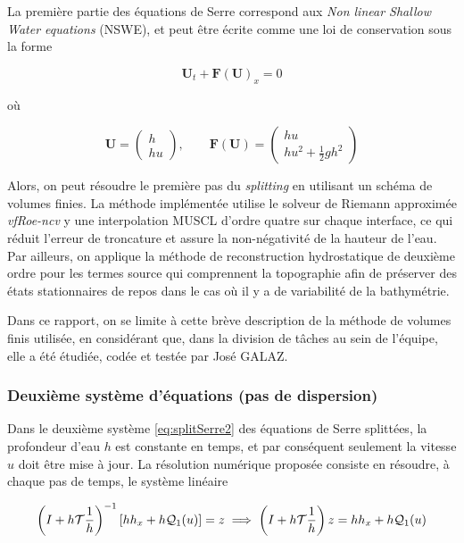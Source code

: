 \indent La première partie des équations de Serre correspond aux \emph{Non linear Shallow Water equations} (NSWE), et peut être écrite comme une loi de conservation sous la forme

\begin{equation*}
	\boldsymbol{U}_t + \boldsymbol{F}(\boldsymbol{U})_x = 0
\end{equation*}

\noindent où

\begin{equation*}
	\boldsymbol{U} = \left(  \begin{array}{c} h \\ hu \end{array} \right), \qquad \boldsymbol{F}(\boldsymbol{U}) = \left(  \begin{array}{c} hu \\ hu^2 + \frac{1}{2}gh^2 \end{array} \right)
\end{equation*}

\indent Alors, on peut résoudre le première pas du \emph{splitting} en utilisant un schéma de volumes finies. La méthode implémentée utilise le solveur de Riemann approximée \emph{vfRoe-ncv} y une interpolation MUSCL d'ordre quatre sur chaque interface, ce qui réduit l'erreur de troncature et assure la non-négativité de la hauteur de l'eau. Par ailleurs, on applique la méthode de reconstruction hydrostatique de deuxième ordre pour les termes source qui comprennent la topographie afin de préserver des états stationnaires de repos dans le cas où il y a de variabilité de la bathymétrie.

\indent Dans ce rapport, on se limite à cette brève description de la méthode de volumes finis utilisée, en considérant que, dans la division de tâches au sein de l'équipe, elle a été étudiée, codée et testée par José GALAZ.


\subsubsection{Deuxième système d'équations (pas de dispersion)}

\indent Dans le deuxième système \eqref{eq:splitSerre2} des équations de Serre splittées, la profondeur d'eau $h$ est constante en temps, et par conséquent seulement la vitesse $u$ doit être mise à jour.  La résolution numérique proposée consiste en résoudre, à chaque pas de temps, le système linéaire

\begin{equation}
	\label{eq:systemhu}
	\left(I + h\mathcal{T}\frac{1}{h} \right)^{-1}\left[ hh_x + h\mathcal{Q}_1(u) \right]  = z \implies \left(I + h\mathcal{T}\frac{1}{h} \right)z = hh_x + h\mathcal{Q}_1(u)
\end{equation}

